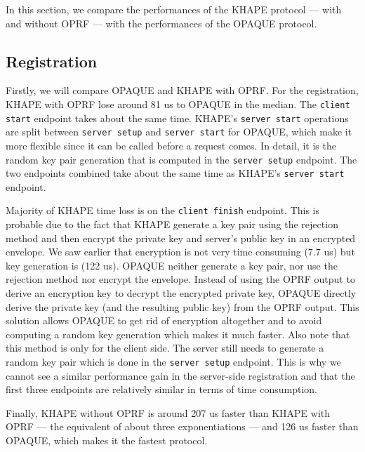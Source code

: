 \documentclass[../report.tex]{subfiles}
\begin{document}
In this section, we compare the performances of the KHAPE protocol --- with and without OPRF --- with the performances of the OPAQUE protocol.


\pgfplotsset{width=\textwidth-2.4cm}

\subsection*{Registration}
Firstly, we will compare OPAQUE and KHAPE with OPRF.
For the registration, KHAPE with OPRF lose around 81 us to OPAQUE in the median.
The \verb|client start| endpoint takes about the same time. KHAPE's \verb|server start| operations are split between \verb|server setup| and \verb|server start| for OPAQUE, which make it more flexible since it can be called before a request comes. In detail, it is the random key pair generation that is computed in the \verb|server setup| endpoint. The two endpoints combined take about the same time as KHAPE's \verb|server start| endpoint.

Majority of KHAPE time loss is on the \verb|client finish| endpoint.
This is probable due to the fact that KHAPE generate a key pair using the rejection method and then encrypt the private key and server's public key in an encrypted envelope.
We saw earlier that encryption is not very time consuming (7.7 us) but key generation is (122 us).
OPAQUE neither generate a key pair, nor use the rejection method nor encrypt the envelope.
Instead of using the OPRF output to derive an encryption key to decrypt the encrypted private key, OPAQUE directly derive the private key (and the resulting public key) from the OPRF output. This solution allows OPAQUE to get rid of encryption altogether and to avoid computing a random key generation which makes it much faster.
Also note that this method is only for the client side. The server still needs to generate a random key pair which is done in the \verb|server setup| endpoint. This is why we cannot see a similar performance gain in the server-side registration and that the first three endpoints are relatively similar in terms of time consumption.

Finally, KHAPE without OPRF is around 207 us faster than KHAPE with OPRF --- the equivalent of about three exponentiations --- and 126 us faster than OPAQUE, which makes it the fastest protocol.
\end{document}
